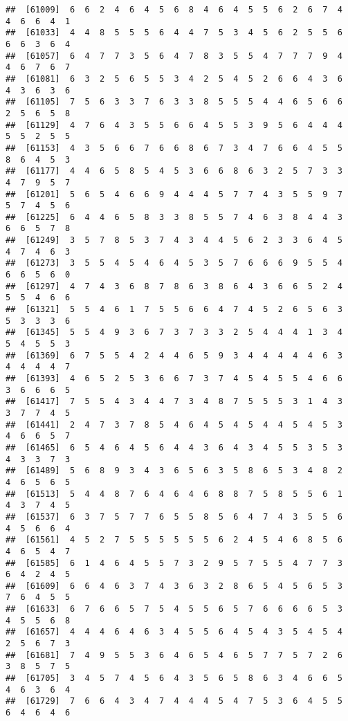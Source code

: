 \documentclass[
]{book}
\begin{document}
\begin{verbatim}
##  [61009]  6  6  2  4  6  4  5  6  8  4  6  4  5  5  6  2  6  7  4  4  6  6  4  1
##  [61033]  4  4  8  5  5  5  6  4  4  7  5  3  4  5  6  2  5  5  6  6  6  3  6  4
##  [61057]  6  4  7  7  3  5  6  4  7  8  3  5  5  4  7  7  7  9  4  4  6  7  6  7
##  [61081]  6  3  2  5  6  5  5  3  4  2  5  4  5  2  6  6  4  3  6  4  3  6  3  6
##  [61105]  7  5  6  3  3  7  6  3  3  8  5  5  5  4  4  6  5  6  6  2  5  6  5  8
##  [61129]  4  7  6  4  3  5  5  6  6  4  5  5  3  9  5  6  4  4  4  5  5  2  5  5
##  [61153]  4  3  5  6  6  7  6  6  8  6  7  3  4  7  6  6  4  5  5  8  6  4  5  3
##  [61177]  4  4  6  5  8  5  4  5  3  6  6  8  6  3  2  5  7  3  3  4  7  9  5  7
##  [61201]  5  6  5  4  6  6  9  4  4  4  5  7  7  4  3  5  5  9  7  5  7  4  5  6
##  [61225]  6  4  4  6  5  8  3  3  8  5  5  7  4  6  3  8  4  4  3  6  6  5  7  8
##  [61249]  3  5  7  8  5  3  7  4  3  4  4  5  6  2  3  3  6  4  5  4  7  4  6  3
##  [61273]  3  5  5  4  5  4  6  4  5  3  5  7  6  6  6  9  5  5  4  6  6  5  6  0
##  [61297]  4  7  4  3  6  8  7  8  6  3  8  6  4  3  6  6  5  2  4  5  5  4  6  6
##  [61321]  5  5  4  6  1  7  5  5  6  6  4  7  4  5  2  6  5  6  3  5  3  3  3  6
##  [61345]  5  5  4  9  3  6  7  3  7  3  3  2  5  4  4  4  1  3  4  5  4  5  5  3
##  [61369]  6  7  5  5  4  2  4  4  6  5  9  3  4  4  4  4  4  6  3  4  4  4  4  7
##  [61393]  4  6  5  2  5  3  6  6  7  3  7  4  5  4  5  5  4  6  6  3  6  6  6  5
##  [61417]  7  5  5  4  3  4  4  7  3  4  8  7  5  5  5  3  1  4  3  3  7  7  4  5
##  [61441]  2  4  7  3  7  8  5  4  6  4  5  4  5  4  4  5  4  5  3  4  6  6  5  7
##  [61465]  6  5  4  6  4  5  6  4  4  3  6  4  3  4  5  5  3  5  3  4  3  3  7  3
##  [61489]  5  6  8  9  3  4  3  6  5  6  3  5  8  6  5  3  4  8  2  4  6  5  6  5
##  [61513]  5  4  4  8  7  6  4  6  4  6  8  8  7  5  8  5  5  6  1  4  3  7  4  5
##  [61537]  6  3  7  5  7  7  6  5  5  8  5  6  4  7  4  3  5  5  6  4  5  6  6  4
##  [61561]  4  5  2  7  5  5  5  5  5  5  6  2  4  5  4  6  8  5  6  4  6  5  4  7
##  [61585]  6  1  4  6  4  5  5  7  3  2  9  5  7  5  5  4  7  7  3  6  4  2  4  5
##  [61609]  6  6  4  6  3  7  4  3  6  3  2  8  6  5  4  5  6  5  3  7  6  4  5  5
##  [61633]  6  7  6  6  5  7  5  4  5  5  6  5  7  6  6  6  6  5  3  4  5  5  6  8
##  [61657]  4  4  4  6  4  6  3  4  5  5  6  4  5  4  3  5  4  5  4  2  5  6  7  3
##  [61681]  7  4  9  5  5  3  6  4  6  5  4  6  5  7  7  5  7  2  6  3  8  5  7  5
##  [61705]  3  4  5  7  4  5  6  4  3  5  6  5  8  6  3  4  6  6  5  4  6  3  6  4
##  [61729]  7  6  6  4  3  4  7  4  4  4  5  4  7  5  3  6  4  5  5  6  4  6  4  6

\end{verbatim}
\end{document}
